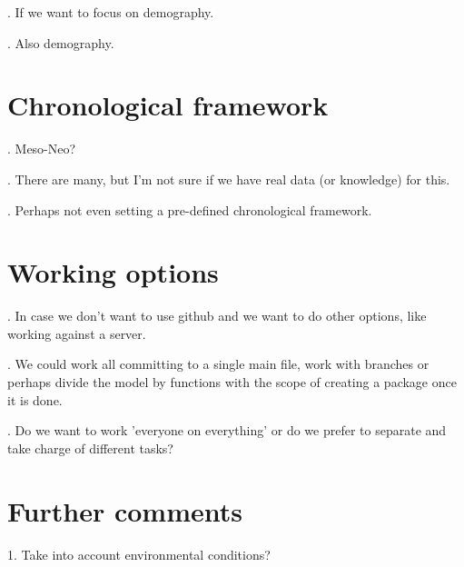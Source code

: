 \documentclass{article}
\begin{document}
. If we want to focus on demography.

. Also demography.



\section{Chronological framework}

. Meso-Neo?

. There are many, but I'm not sure if we have real data (or knowledge) for this.

. Perhaps not even setting a pre-defined chronological framework.

\section{Working options}

. In case we don't want to use github and we want to do other options, like working against a server.

. We could work all committing to a single main file, work with branches or perhaps divide the model by functions with the scope of creating a package once it is done.

. Do we want to work 'everyone on everything' or do we prefer to separate and take charge of different tasks?

\section{Further comments}

1. Take into account environmental conditions?

\end{document}
